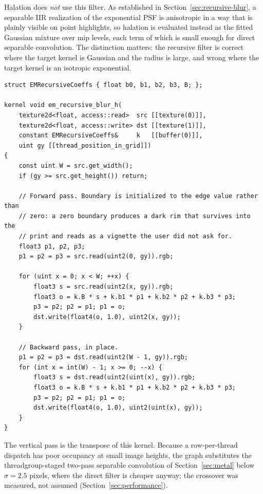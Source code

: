 Halation does \emph{not} use this filter. As established in
Section~\ref{sec:recursive-blur}, a separable IIR realization of the exponential
PSF is anisotropic in a way that is plainly visible on point highlights, so
halation is evaluated instead as the fitted Gaussian mixture over mip levels,
each term of which is small enough for direct separable convolution. The
distinction matters: the recursive filter is correct where the target kernel is
Gaussian and the radius is large, and wrong where the target kernel is an
isotropic exponential.

\begin{lstlisting}[language=Metal, caption={Recursive Gaussian, one axis, one row per thread.}, label={lst:recursive}]
struct EMRecursiveCoeffs { float b0, b1, b2, b3, B; };

kernel void em_recursive_blur_h(
    texture2d<float, access::read>  src [[texture(0)]],
    texture2d<float, access::write> dst [[texture(1)]],
    constant EMRecursiveCoeffs&     k   [[buffer(0)]],
    uint gy [[thread_position_in_grid]])
{
    const uint W = src.get_width();
    if (gy >= src.get_height()) return;

    // Forward pass. Boundary is initialized to the edge value rather than
    // zero: a zero boundary produces a dark rim that survives into the
    // print and reads as a vignette the user did not ask for.
    float3 p1, p2, p3;
    p1 = p2 = p3 = src.read(uint2(0, gy)).rgb;

    for (uint x = 0; x < W; ++x) {
        float3 s = src.read(uint2(x, gy)).rgb;
        float3 o = k.B * s + k.b1 * p1 + k.b2 * p2 + k.b3 * p3;
        p3 = p2; p2 = p1; p1 = o;
        dst.write(float4(o, 1.0), uint2(x, gy));
    }

    // Backward pass, in place.
    p1 = p2 = p3 = dst.read(uint2(W - 1, gy)).rgb;
    for (int x = int(W) - 1; x >= 0; --x) {
        float3 s = dst.read(uint2(uint(x), gy)).rgb;
        float3 o = k.B * s + k.b1 * p1 + k.b2 * p2 + k.b3 * p3;
        p3 = p2; p2 = p1; p1 = o;
        dst.write(float4(o, 1.0), uint2(uint(x), gy));
    }
}
\end{lstlisting}

The vertical pass is the transpose of this kernel. Because a row-per-thread
dispatch has poor occupancy at small image heights, the graph substitutes the
threadgroup-staged two-pass separable convolution of Section~\ref{sec:metal}
below $\sigma = 2.5$ pixels, where the direct filter is cheaper anyway; the
crossover was measured, not assumed (Section~\ref{sec:performance}).

